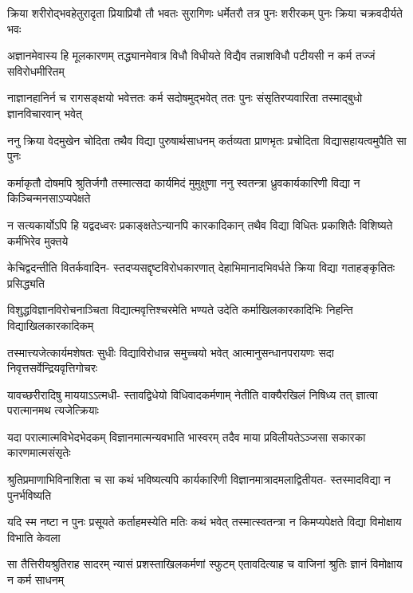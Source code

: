 \fourlineindentedshloka
{क्रिया शरीरोद्भवहेतुरादृता}
{प्रियाप्रियौ तौ भवतः सुरागिणः}
{धर्मेतरौ तत्र पुनः शरीरकम्}
{पुनः क्रिया चक्रवदीर्यते भवः} %

\fourlineindentedshloka
{अज्ञानमेवास्य हि मूलकारणम्}
{तद्ध्यानमेवात्र विधौ विधीयते}
{विद्यैव तन्नाशविधौ पटीयसी}
{न कर्म तज्जं सविरोधमीरितम्} %

\fourlineindentedshloka
{नाज्ञानहानिर्न च रागसङ्क्षयो}
{भवेत्ततः कर्म सदोषमुद्भवेत्}
{ततः पुनः संसृतिरप्यवारिता}
{तस्माद्बुधो ज्ञानविचारवान् भवेत्} %

\fourlineindentedshloka
{ननु क्रिया वेदमुखेन चोदिता}
{तथैव विद्या पुरुषार्थसाधनम्}
{कर्तव्यता प्राणभृतः प्रचोदिता}
{विद्यासहायत्वमुपैति सा पुनः} %

\fourlineindentedshloka
{कर्माकृतौ दोषमपि श्रुतिर्जगौ}
{तस्मात्सदा कार्यमिदं मुमुक्षुणा}
{ननु स्वतन्त्रा ध्रुवकार्यकारिणी}
{विद्या न किञ्चिन्मनसाऽप्यपेक्षते} %

\fourlineindentedshloka
{न सत्यकार्योऽपि हि यद्वदध्वरः}
{प्रकाङ्क्षतेऽन्यानपि कारकादिकान्}
{तथैव विद्या विधितः प्रकाशितैः}
{विशिष्यते कर्मभिरेव मुक्तये} %

\fourlineindentedshloka
{केचिद्वदन्तीति वितर्कवादिन-}
{स्तदप्यसद्दृष्टविरोधकारणात्}
{देहाभिमानादभिवर्धते क्रिया}
{विद्या गताहङ्कृतितः प्रसिद्ध्यति} %

\fourlineindentedshloka
{विशुद्धविज्ञानविरोचनाञ्चिता}
{विद्यात्मवृत्तिश्चरमेति भण्यते}
{उदेति कर्माखिलकारकादिभिः}
{निहन्ति विद्याखिलकारकादिकम्} %

\fourlineindentedshloka
{तस्मात्त्यजेत्कार्यमशेषतः सुधीः}
{विद्याविरोधान्न समुच्चयो भवेत्}
{आत्मानुसन्धानपरायणः सदा}
{निवृत्तसर्वेन्द्रियवृत्तिगोचरः} %

\fourlineindentedshloka
{यावच्छरीरादिषु माययाऽऽत्मधी-}
{स्तावद्विधेयो विधिवादकर्मणाम्}
{नेतीति वाक्यैरखिलं निषिध्य तत्}
{ज्ञात्वा परात्मानमथ त्यजेत्क्रियाः} %

\fourlineindentedshloka
{यदा परात्मात्मविभेदभेदकम्}
{विज्ञानमात्मन्यवभाति भास्वरम्}
{तदैव माया प्रविलीयतेऽञ्जसा}
{सकारका कारणमात्मसंसृतेः} %

\fourlineindentedshloka
{श्रुतिप्रमाणाभिविनाशिता च सा}
{कथं भविष्यत्यपि कार्यकारिणी}
{विज्ञानमात्रादमलाद्वितीयत-}
{स्तस्मादविद्या न पुनर्भविष्यति} %

\fourlineindentedshloka
{यदि स्म नष्टा न पुनः प्रसूयते}
{कर्ताहमस्येति मतिः कथं भवेत्}
{तस्मात्स्वतन्त्रा न किमप्यपेक्षते}
{विद्या विमोक्षाय विभाति केवला} %

\fourlineindentedshloka
{सा तैत्तिरीयश्रुतिराह सादरम्}
{न्यासं प्रशस्ताखिलकर्मणां स्फुटम्}
{एतावदित्याह च वाजिनां श्रुतिः}
{ज्ञानं विमोक्षाय न कर्म साधनम्} %

